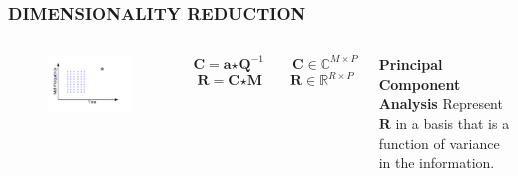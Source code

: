 \documentclass{beamer}
\begin{document}
\begin{frame}
\frametitle{DIMENSIONALITY REDUCTION}
\begin{columns}[c]
\begin{figure}
\includegraphics[width=\textwidth]{rep_3}
\end{figure}
\[
\textbf{C} = \textbf{a} \bm{\star} \textbf{Q}^{-1} \qquad \textbf{C} \in \mathbb{C}^{M \times P}
\]
\[
\textbf{R} = \textbf{C} \bm{\star} \textbf{M} \qquad \textbf{R} \in \mathbb{R}^{R \times P}
\]
\begin{block}{\textbf{Principal Component Analysis}}
Represent $\textbf{R}$ in a basis that is a function of variance in the information.
\end{block}
\end{columns}
\end{frame}
\end{document}
